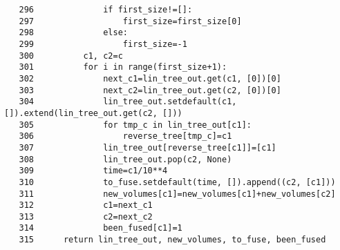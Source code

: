 \documentclass{article}
\begin{document}
\begin{verbatim}
   296	            if first_size!=[]:
   297	                first_size=first_size[0]
   298	            else:
   299	                first_size=-1
   300	        c1, c2=c
   301	        for i in range(first_size+1):
   302	            next_c1=lin_tree_out.get(c1, [0])[0]
   303	            next_c2=lin_tree_out.get(c2, [0])[0]
   304	            lin_tree_out.setdefault(c1, []).extend(lin_tree_out.get(c2, []))
   305	            for tmp_c in lin_tree_out[c1]:
   306	                reverse_tree[tmp_c]=c1
   307	            lin_tree_out[reverse_tree[c1]]=[c1]
   308	            lin_tree_out.pop(c2, None)
   309	            time=c1/10**4
   310	            to_fuse.setdefault(time, []).append((c2, [c1]))
   311	            new_volumes[c1]=new_volumes[c1]+new_volumes[c2]
   312	            c1=next_c1
   313	            c2=next_c2
   314	            been_fused[c1]=1
   315	    return lin_tree_out, new_volumes, to_fuse, been_fused
\end{verbatim}



\end{document}
